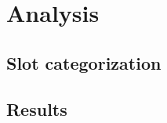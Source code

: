 \chapter{Analysis}


\begin{chapterabstract}
  \todoadd
\end{chapterabstract}


\section{Slot categorization}

\section{Results}
